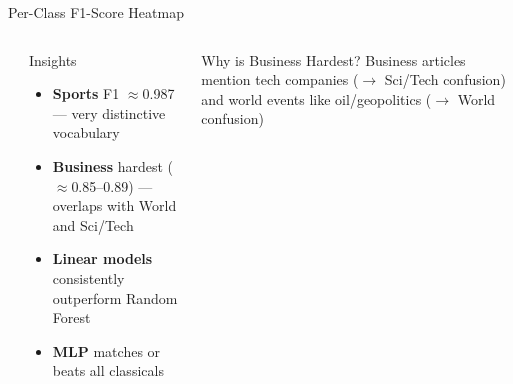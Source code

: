 \documentclass[aspectratio=169,11pt]{beamer}
\begin{document}
\begin{frame}{Per-Class F1-Score Heatmap}
\begin{columns}[T]
\begin{center}
    \end{center}
    \begin{block}{Insights}
      \footnotesize
      \begin{itemize}
        \item \textbf{Sports} F1 $\approx$0.987 --- very distinctive vocabulary
        \item \textbf{Business} hardest ($\approx$0.85--0.89) --- overlaps with World and Sci/Tech
        \item \textbf{Linear models} consistently outperform Random Forest
        \item \textbf{MLP} matches or beats all classicals
      \end{itemize}
    \end{block}
    \vspace{4pt}
    \begin{alertblock}{Why is Business Hardest?}
      \footnotesize
      Business articles mention tech companies ($\to$ Sci/Tech confusion) and world events like oil/geopolitics ($\to$ World confusion)
    \end{alertblock}
\end{columns}
\end{frame}
\end{document}
